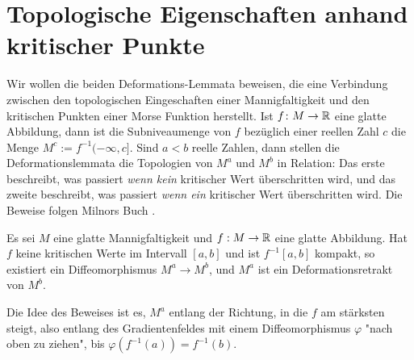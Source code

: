 \section{Topologische Eigenschaften anhand kritischer Punkte}

Wir wollen die beiden Deformations-Lemmata beweisen, die eine Verbindung zwischen den topologischen
Eingeschaften einer Mannigfaltigkeit und den kritischen Punkten einer Morse Funktion herstellt.
Ist $f \colon M \to { \mathbb R }$ eine glatte Abbildung, dann ist die Subniveaumenge von $f$ bezüglich 
einer reellen Zahl $c$ die Menge $M^c := f^{-1}(- \infty, c]$. Sind $a < b$ reelle Zahlen, dann
stellen die Deformationslemmata die Topologien von $M^a$ und $M^b$ in Relation: Das erste beschreibt, 
was passiert \textit{wenn kein} kritischer Wert überschritten wird, und das zweite beschreibt, was 
passiert \textit{wenn ein} kritischer Wert überschritten wird. Die Beweise folgen Milnors Buch 
\cite{morse}.

\begin{theorem}
    \label{satz: erstes deformationslemma}
    Es sei $M$ eine glatte Mannigfaltigkeit und $f: M \rightarrow { \mathbb R }$ eine
    glatte Abbildung. Hat $f$ keine kritischen Werte im Intervall $[a, b]$ und 
    ist $f^{-1}[a, b]$ kompakt, so existiert ein Diffeomorphismus 
    $M^a \rightarrow M^b$, und $M^a$ ist ein Deformationsretrakt von $M^b$.
\end{theorem}

Die Idee des Beweises ist es, $M^a$ entlang der Richtung, in die $f$ am stärksten
steigt, also entlang des Gradientenfeldes mit einem Diffeomorphismus $\varphi$ 
"nach oben zu ziehen", bis $\varphi(f^{-1}(a)) = f^{-1}(b)$.

